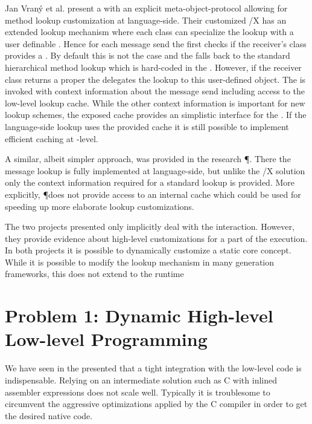 Jan Vran\'{y} et al. present a \ST with an explicit meta-object-protocol allowing for method lookup customization at language-side\cite{Vran12a}.
Their customized \ST/X \VM has an extended lookup mechanism where each class can specialize the lookup with a user definable .
Hence for each message send the \VM first checks if the receiver's class provides a .
By default this is not the case and the \VM falls back to the standard hierarchical \ST method lookup which is hard-coded in the \VM.
However, if the receiver class returns a proper  the \VM delegates the lookup to this user-defined object.
The  is invoked with context information about the message send including access to the low-level lookup cache.
While the other context information is important for new lookup schemes, the exposed cache provides an simplistic interface for the \JIT.
If the language-side lookup uses the provided cache it is still possible to implement efficient caching at \VM-level.


A similar, albeit simpler approach, was provided in the research \ST \VM \P \cite{Verw12a}.
There the message lookup is fully implemented at language-side, but unlike the \ST/X solution only the context information required for a standard \ST lookup is provided.
More explicitly, \P does not provide access to an internal cache which could be used for speeding up more elaborate lookup customizations.

The two projects presented only implicitly deal with the \JIT interaction.
However, they provide evidence about high-level customizations for a part of the execution.
In both projects it is possible to dynamically customize a static core \VM concept.
While it is possible to modify the lookup mechanism in many \VM generation frameworks, this does not extend to the runtime

\section{Problem 1: Dynamic High-level Low-level Programming}
We have seen in the presented \VMs that a tight integration with the low-level code is indispensable.
Relying on an intermediate solution such as C with inlined assembler expressions does not scale well.
Typically it is troublesome to circumvent the aggressive optimizations applied by the C compiler in order to get the desired native code.

